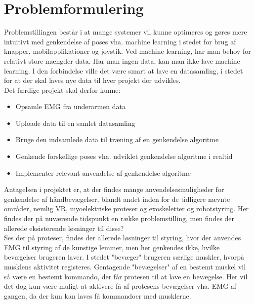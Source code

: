 \thispagestyle{fancy}
\chapter{Problemformulering}
\label{chp:problemformulering}

Problemstillingen består i at mange systemer vil kunne optimeres og gøres mere intuitivt med genkendelse af poses vha. machine learning i stedet for brug af knapper, mobilapplikationer og joystik. Ved machine learning, har man behov for relativt store mængder data. Har man ingen data, kan man ikke lave machine learning. I den forbindelse ville det være smart at lave en datasamling, i stedet for at der skal laves nye data til hver projekt der udvikles.\\

Det færdige projekt skal derfor kunne:
\begin{itemize}
	\item Opsamle EMG fra underarmen data
	\item Uploade data til en samlet datasamling
	\item Bruge den indsamlede data til træning af en genkendelse algoritme
	\item Genkende forskellige poses vha. udviklet genkendelse algoritme i realtid
	\item Implementer relevant anvendelse af genkendelse algoritme
\end{itemize}
Antagelsen i projektet er, at der findes mange anvendelsesmuligheder for genkendelse af håndbevægelser, blandt andet inden for de tidligere nævnte områder, nemlig VR, myoelektriske proteser og exoskeletter og robotstyring. Her findes der på nuværende tidspunkt en række problemstilling, men findes der allerede eksisterende løsninger til disse?\\

Ses der på proteser, findes der allerede løsninger til styring, hvor der anvendes EMG til styring af de kunstige lemmer, men her genkendes ikke, hvilke bevægelser brugeren laver. I stedet "bevæger" brugeren særlige muskler, hvorpå musklens aktivitet registeres. Gentagende "bevægelser" af en bestemt muskel vil så være en bestemt kommando, der får protesen til at lave en bevægelse. Her vil det dog kun være muligt at aktivere få af protesens bevægelser vha. EMG af gangen, da der kun kan laves få kommandoer med musklerne. \\

